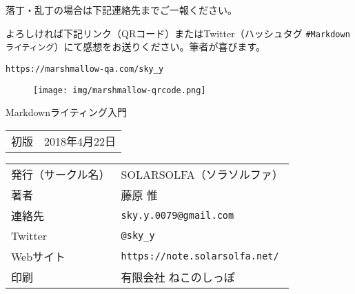 \backmatter

\thispagestyle{empty}

\begin{center}
落丁・乱丁の場合は下記連絡先までご一報ください。

よろしければ下記リンク（QRコード）またはTwitter（ハッシュタグ \verb|#Markdownライティング|）にて感想をお送りください。筆者が喜びます。

\verb|https://marshmallow-qa.com/sky_y|
\end{center}

\begin{figure}
\begin{center}
\texttt{[image: img/marshmallow-qrcode.png]}
\end{center}
\end{figure}

\begin{center}
\textsf{Markdownライティング入門}

\begin{tabular}{ll}
    初版   & 2018年4月22日
\end{tabular}

\begin{tabular}{ll} \toprule
    発行（サークル名）   & SOLARSOLFA（ソラソルファ）    \\
    著者      & 藤原 惟          \\
    連絡先     & \verb|sky.y.0079@gmail.com| \\
    Twitter & \verb|@sky_y|   \\
    Webサイト & \verb|https://note.solarsolfa.net/| \\
    印刷      & 有限会社 ねこのしっぽ  \\ \bottomrule
\end{tabular}
\end{center}




